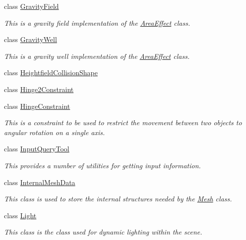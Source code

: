 \begin{DoxyCompactItemize}
class \hyperlink{classphys_1_1GravityField}{GravityField}
\begin{DoxyCompactList}\small\item\em This is a gravity field implementation of the \hyperlink{classphys_1_1AreaEffect}{AreaEffect} class. \item\end{DoxyCompactList}\item 
class \hyperlink{classphys_1_1GravityWell}{GravityWell}
\begin{DoxyCompactList}\small\item\em This is a gravity well implementation of the \hyperlink{classphys_1_1AreaEffect}{AreaEffect} class. \item\end{DoxyCompactList}\item 
class \hyperlink{classphys_1_1HeightfieldCollisionShape}{HeightfieldCollisionShape}
\item 
class \hyperlink{classphys_1_1Hinge2Constraint}{Hinge2Constraint}
\item 
class \hyperlink{classphys_1_1HingeConstraint}{HingeConstraint}
\begin{DoxyCompactList}\small\item\em This is a constraint to be used to restrict the movement between two objects to angular rotation on a single axis. \item\end{DoxyCompactList}\item 
class \hyperlink{classphys_1_1InputQueryTool}{InputQueryTool}
\begin{DoxyCompactList}\small\item\em This provides a number of utilities for getting input information. \item\end{DoxyCompactList}\item 
class \hyperlink{classphys_1_1InternalMeshData}{InternalMeshData}
\begin{DoxyCompactList}\small\item\em This class is used to store the internal structures needed by the \hyperlink{classphys_1_1Mesh}{Mesh} class. \item\end{DoxyCompactList}\item 
class \hyperlink{classphys_1_1Light}{Light}
\begin{DoxyCompactList}\small\item\em This class is the class used for dynamic lighting within the scene. \item\end{DoxyCompactList}\item 

\end{DoxyCompactItemize}
